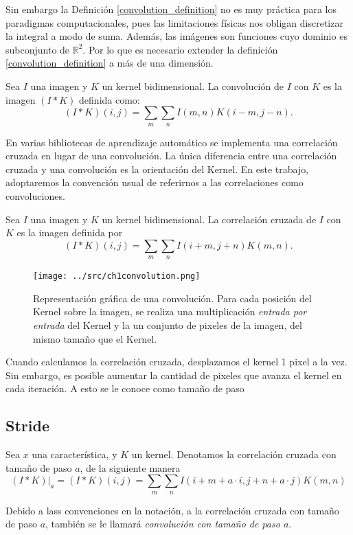  Sin embargo la Definición \ref{convolution_definition} no es muy práctica para los paradigmas computacionales, pues  las limitaciones físicas nos obligan discretizar la integral a modo de suma. Además, las imágenes son funciones cuyo dominio es subconjunto de $\mathbb R^2$. Por lo que es necesario extender la definición \ref{convolution_definition} a más de una dimensión.
 \begin{definition}
     Sea $I$ una imagen y $K$ un kernel bidimensional. La convolución de $I$ con $K$ es la imagen $(I*K)$ definida como:
     $$(I*K)(i,j) = \sum_m\sum_n I(m,n)K(i-m,j-n).$$ 
 \end{definition}
 En varias bibliotecas de aprendizaje automático se implementa una correlación cruzada en lugar de una convolución. La única diferencia entre una correlación cruzada y una convolución es la orientación del Kernel. En este trabajo, adoptaremos la convención usual de referirnos a las correlaciones como convoluciones. 
 \begin{definition}
     Sea $I$ una imagen y $K$ un kernel bidimensional. La correlación cruzada de $I$ con $K$ es la imagen definida por 
     $$(I*K)(i,j) = \sum_m\sum_n I(i+m,j+n)K(m,n).$$ 
 \end{definition} 

 \begin{figure}[H]
     \centering
     \texttt{[image: ../src/ch1convolution.png]}
     \caption{Representación gráfica de una convolución. Para cada posición del Kernel sobre la imagen, se realiza una multiplicación \textsl{entrada por entrada} del Kernel y la un conjunto de pixeles de la imagen, del mismo tamaño que el Kernel.} 
 \end{figure}
 Cuando calculamos la correlación cruzada, desplazamos el kernel 1 pixel a la vez. Sin embargo, es posible aumentar la cantidad de pixeles que avanza el kernel en cada iteración. A esto se le conoce como tamaño de paso 

 
 \subsection{Stride}
 \begin{definition}
    Sea $x$ una característica, y $K$ un kernel. Denotamos la correlación cruzada con tamaño de paso $a$, de la siguiente manera 
    \begin{equation}
        (I*K)|_a = (I*K)(i,j) = \sum_m\sum_n I(i+m+a \cdot i,j+n+a \cdot j)K(m,n)
    \end{equation}
 \end{definition}
 Debido a lass convenciones en la notación, a la correlación cruzada con tamaño de paso $a$, también se le llamará \textsl{convolución con tamaño de paso $a$}.

